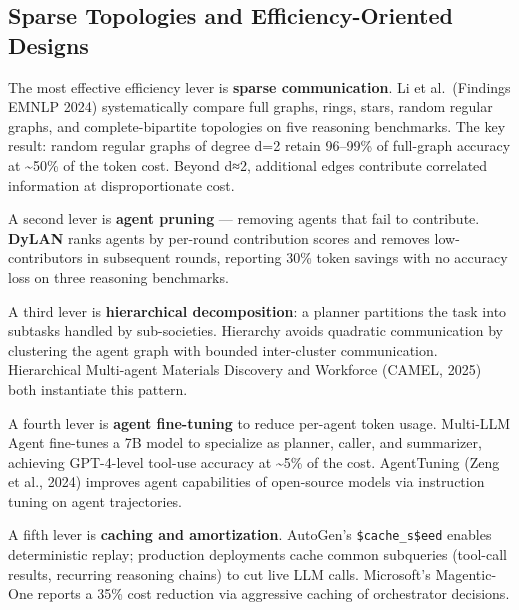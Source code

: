 \documentclass{article}
\begin{document}
\subsection{Sparse Topologies and Efficiency-Oriented Designs}\label{sparse-topologies-and-efficiency-oriented-designs}

The most effective efficiency lever is \textbf{sparse communication}. Li et al.~(Findings EMNLP 2024) systematically compare full graphs, rings, stars, random regular graphs, and complete-bipartite topologies on five reasoning benchmarks. The key result: random regular graphs of degree d=2 retain 96--99\% of full-graph accuracy at \textasciitilde50\% of the token cost. Beyond d≈2, additional edges contribute correlated information at disproportionate cost.

A second lever is \textbf{agent pruning} --- removing agents that fail to contribute. \textbf{DyLAN} \citep{liu20242024} ranks agents by per-round contribution scores and removes low-contributors in subsequent rounds, reporting 30\% token savings with no accuracy loss on three reasoning benchmarks.

A third lever is \textbf{hierarchical decomposition}: a planner partitions the task into subtasks handled by sub-societies. Hierarchy avoids quadratic communication by clustering the agent graph with bounded inter-cluster communication. Hierarchical Multi-agent Materials Discovery \citep{rothfarb20252025} and Workforce (CAMEL, 2025) both instantiate this pattern.

A fourth lever is \textbf{agent fine-tuning} to reduce per-agent token usage. Multi-LLM Agent \citep{shen2024smallllmsareweakto} fine-tunes a 7B model to specialize as planner, caller, and summarizer, achieving GPT-4-level tool-use accuracy at \textasciitilde5\% of the cost. AgentTuning (Zeng et al., 2024) improves agent capabilities of open-source models via instruction tuning on agent trajectories.

A fifth lever is \textbf{caching and amortization}. AutoGen's \texttt{\$cache\_s\$eed} enables deterministic replay; production deployments cache common subqueries (tool-call results, recurring reasoning chains) to cut live LLM calls. Microsoft's Magentic-One reports a 35\% cost reduction via aggressive caching of orchestrator decisions.
\end{document}
